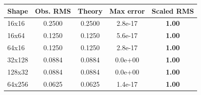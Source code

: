 \footnotesize
\begin{tabular}{lcccc}
\toprule
Shape & Obs. RMS & Theory & Max error & Scaled RMS \\
\midrule
16x16 & 0.2500 & 0.2500 & 2.8e-17 & \textbf{1.00} \\
16x64 & 0.1250 & 0.1250 & 5.6e-17 & \textbf{1.00} \\
64x16 & 0.1250 & 0.1250 & 2.8e-17 & \textbf{1.00} \\
32x128 & 0.0884 & 0.0884 & 0.0e+00 & \textbf{1.00} \\
128x32 & 0.0884 & 0.0884 & 0.0e+00 & \textbf{1.00} \\
64x256 & 0.0625 & 0.0625 & 1.4e-17 & \textbf{1.00} \\
\bottomrule
\end{tabular}
